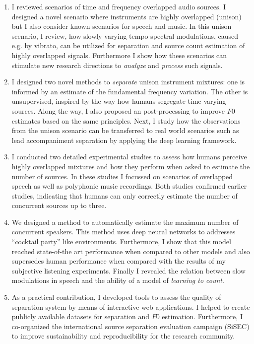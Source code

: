 \begin{enumerate}
\item I reviewed scenarios of time and frequency overlapped audio sources.
I designed a novel scenario where instruments are highly overlapped (unison) but I also consider known scenarios for speech and music.
In this unison scenario, I review, how slowly varying tempo-spectral modulations, caused e.g. by vibrato, can be utilized for separation and source count estimation of highly overlapped signals.
Furthermore I show how these scenarios can stimulate new research directions to \emph{analyze} and \emph{process} such signals.

\item I designed two novel methods to \emph{separate} unison instrument mixtures: one is informed by an estimate of the fundamental frequency variation.
The other is unsupervised, inspired by the way how humans segregate time-varying sources.
Along the way, I also proposed an post-processing to improve \(F0\) estimates based on the same principles.
Next, I study how the observations from the unison scenario can be transferred to real world scenarios such as lead accompaniment separation by applying the deep learning framework.

\item I conducted two detailed experimental studies to assess how humans perceive highly overlapped mixtures and how they perform when asked to estimate the number of sources.
In these studies I focussed on scenarios of overlapped speech as well as polyphonic music recordings.
Both studies confirmed earlier studies, indicating that humans can only correctly estimate the number of concurrent sources up to three.

\item We designed a method to automatically estimate the maximum number of concurrent speakers. This method uses deep neural networks to addresses ``cocktail party'' like environments.
Furthermore, I show that this model reached state-of-the art performance when compared to other models and also supersedes human performance when compared with the results of my subjective listening experiments.
Finally I revealed the relation between slow modulations in speech and the ability of a model of \emph{learning to count}.

\item As a practical contribution, I developed tools to assess the quality of separation system by means of interactive web applications. 
I helped to create publicly available datasets for separation and \(F0\) estimation.
Furthermore, I  co-organized the international source separation evaluation campaign (SiSEC) to improve sustainability and reproducibility for the research community.
\end{enumerate}

